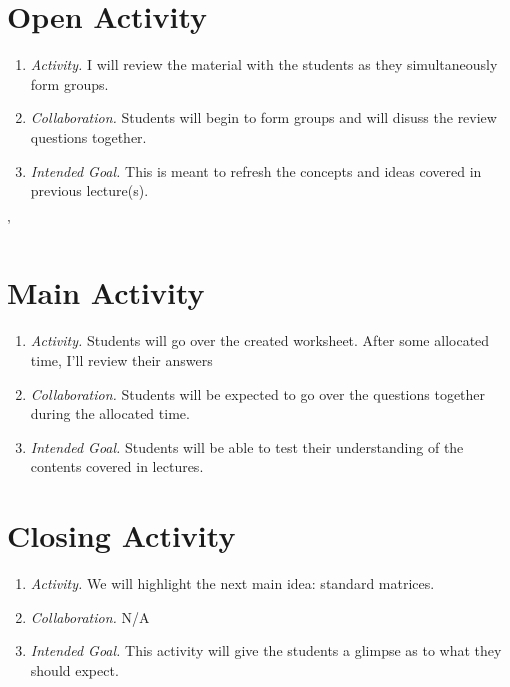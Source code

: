 \documentclass[11pt]{article}
\begin{document}
\section{\centering Open Activity}
	\begin{enumerate}
		\item \textit{Activity.} I will review the material with the students as they simultaneously form groups.
		\item \textit{Collaboration.} Students will begin to form groups and will disuss the review questions together.
		\item \textit{Intended Goal.} This is meant to refresh the concepts and ideas covered in previous lecture(s).
	\end{enumerate}'

\section{\centering Main Activity}
	\begin{enumerate}
		\item \textit{Activity.} Students will go over the created worksheet. After some allocated time, I'll review their answers
		\item \textit{Collaboration.} Students will be expected to go over the questions together during the allocated time.
		\item \textit{Intended Goal.} Students will be able to test their understanding of the contents covered in lectures.
	\end{enumerate}
\section{\centering Closing Activity}
	\begin{enumerate}
		\item \textit{Activity.} We will highlight the next main idea: standard matrices.
		\item \textit{Collaboration.} N/A
		\item \textit{Intended Goal.} This activity will give the students a glimpse as to what they should expect.
	\end{enumerate}
\end{document}
